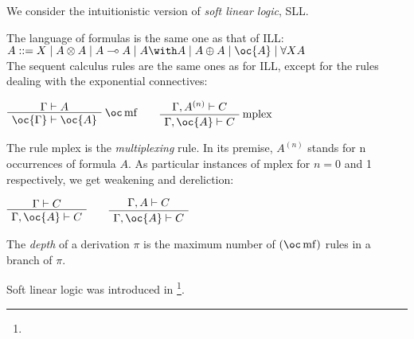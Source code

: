 We consider the intuitionistic version of \emph{soft linear logic}, SLL.

The language of formulas is the same one as that of ILL:
\(A ::= X \mid A\tens A \mid A\limp A \mid A\with A \mid  A\plus A   \mid \oc{A} \mid \forall X A\)\\
The sequent calculus rules are the same ones as for ILL, except for the
rules dealing with the exponential connectives:

\(\AxRule{\Gamma\vdash A}
\LabelRule{\oc\rulename{mf} }
\UnaRule{\oc{\Gamma}\vdash\oc{A}}
\DisplayProof
\qquad
\AxRule{\Gamma,A^{(n)}\vdash C}
\LabelRule{\rulename{mplex}}
\UnaRule{\Gamma,\oc{A}\vdash C}
\DisplayProof\)

The rule mplex is the \emph{multiplexing} rule. In its premise,
\(A^{(n)}\) stands for n occurrences of formula \(A\). As particular
instances of mplex for \(n=0\) and 1 respectively, we get weakening and
dereliction:

\(\AxRule{\Gamma \vdash C}
\UnaRule{\Gamma,\oc{A}\vdash C}
\DisplayProof
\qquad
\AxRule{\Gamma,A\vdash C}
\UnaRule{\Gamma,\oc{A}\vdash C}
\DisplayProof\)

The \emph{depth} of a derivation \(\pi\) is the maximum number of
\((\oc\rulename{mf})\) rules in a branch of \(\pi\).

Soft linear logic was introduced in \footnote{}.



